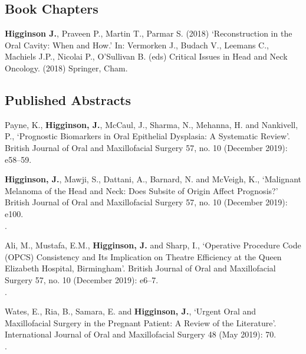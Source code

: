 \subsection*{Book Chapters}

 \textbf{Higginson J.}, Praveen P., Martin T., Parmar S. (2018) `Reconstruction in the Oral Cavity: When and How.' In: Vermorken J., Budach V., Leemans C., Machiels J.P., Nicolai P., O'Sullivan B. (eds) Critical Issues in Head and Neck Oncology. (2018) Springer, Cham. 
\\



\subsection*{Published Abstracts}

 Payne, K., \textbf{Higginson, J.}, McCaul, J., Sharma, N., Mehanna, H. and Nankivell, P., `Prognostic Biomarkers in Oral Epithelial Dysplasia: A Systematic Review’. British Journal of Oral and Maxillofacial Surgery 57, no. 10 (December 2019): e58–59. 
\\

\vspace{0.1cm}

 \textbf{Higginson, J.}, Mawji, S., Dattani, A., Barnard, N. and McVeigh, K., `Malignant Melanoma of the Head and Neck: Does Subsite of Origin Affect Prognosis?’ British Journal of Oral and Maxillofacial Surgery 57, no. 10 (December 2019): e100. 
\\.

\vspace{0.1cm}

 Ali, M., Mustafa, E.M., \textbf{Higginson, J.} and Sharp, I., `Operative Procedure Code (OPCS) Consistency and Its Implication on Theatre Efficiency at the Queen Elizabeth Hospital, Birmingham’. British Journal of Oral and Maxillofacial Surgery 57, no. 10 (December 2019): e6–7. 
\\.

\vspace{0.1cm}

 Wates, E., Ria, B., Samara, E. and \textbf{Higginson, J.}, `Urgent Oral and Maxillofacial Surgery in the Pregnant Patient: A Review of the Literature’. International Journal of Oral and Maxillofacial Surgery 48 (May 2019): 70. 
\\.

